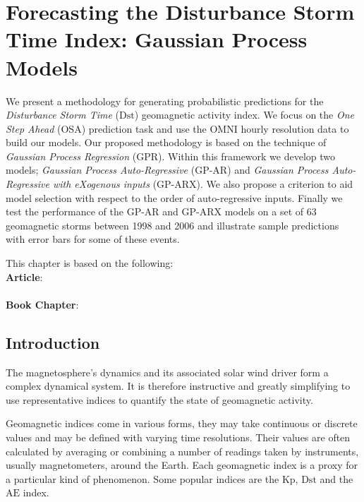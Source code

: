\chapter{Forecasting the Disturbance Storm Time Index: Gaussian Process Models}\label{chapter:dst_osa}

{\small
    We present a methodology for generating probabilistic predictions for the \emph{Disturbance Storm Time} 
    ($\mathrm{Dst}$) geomagnetic activity index. We focus on the \emph{One Step Ahead} (OSA) prediction task and 
    use the OMNI hourly resolution data to build our models. Our proposed methodology is based on the technique of 
    \emph{Gaussian Process Regression} (GPR). Within this framework we develop two models; 
    \emph{Gaussian Process Auto-Regressive} (GP-AR) and \emph{Gaussian Process Auto-Regressive with eXogenous inputs} 
    (GP-ARX). We also propose a criterion to aid model selection with respect to the order of auto-regressive inputs. 
    Finally we test the performance of the GP-AR and GP-ARX models on a set of 63 geomagnetic storms between 1998 
    and 2006 and illustrate sample predictions with error bars for some of these events.
}
        
\vfill
{}
\vfill

\noindent
    \parbox{\textwidth}{%
        {\small This chapter is based on the following:\\
        
        \textbf{Article}:\\
        \\
        
        \textbf{Book Chapter}:\\
        }
    }%

\clearpage

\section{Introduction}


The magnetosphere's dynamics and its associated solar wind driver form a complex dynamical system. It is therefore instructive and greatly simplifying to use representative indices to quantify the state of geomagnetic activity.

Geomagnetic indices come in various forms, they may take continuous or discrete values and may be defined with varying time resolutions. Their values are often calculated by averaging or combining a number of readings taken by instruments, usually magnetometers, around the Earth. Each geomagnetic index is a proxy for a particular kind of phenomenon. Some popular indices are the $\mathrm{Kp}$, $\mathrm{Dst}$ and the $\mathrm{AE}$ index.


